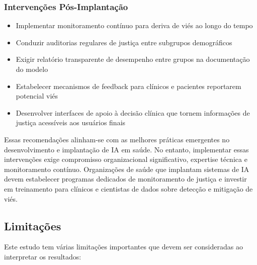 \subsubsection{Intervenções Pós-Implantação}
\begin{itemize}[leftmargin=*]
    \item Implementar monitoramento contínuo para deriva de viés ao longo 
          do tempo
    \item Conduzir auditorias regulares de justiça entre subgrupos 
          demográficos
    \item Exigir relatório transparente de desempenho entre grupos na 
          documentação do modelo
    \item Estabelecer mecanismos de feedback para clínicos e pacientes 
          reportarem potencial viés
    \item Desenvolver interfaces de apoio à decisão clínica que tornem 
          informações de justiça acessíveis aos usuários finais
\end{itemize}

Essas recomendações alinham-se com as melhores práticas emergentes no 
desenvolvimento e implantação de IA em saúde. No entanto, implementar 
essas intervenções exige compromisso organizacional significativo, 
expertise técnica e monitoramento contínuo. Organizações de saúde que 
implantam sistemas de IA devem estabelecer programas dedicados de 
monitoramento de justiça e investir em treinamento para clínicos e 
cientistas de dados sobre detecção e mitigação de viés.

\subsection{Limitações}

Este estudo tem várias limitações importantes que devem ser consideradas 
ao interpretar os resultados:

